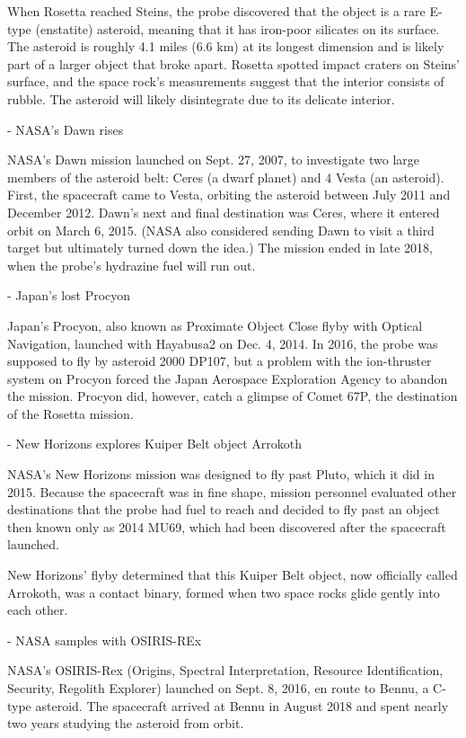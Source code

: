 When Rosetta reached Steins, the probe discovered that the object is a rare
E-type (enstatite) asteroid, meaning that it has iron-poor silicates on its
surface. The asteroid is roughly 4.1 miles (6.6 km) at its longest dimension and
is likely part of a larger object that broke apart. Rosetta spotted impact
craters on Steins' surface, and the space rock's measurements suggest that the
interior consists of rubble. The asteroid will likely disintegrate due to its
delicate interior.

- NASA's Dawn rises

NASA's Dawn mission launched on Sept. 27, 2007, to investigate two large members
of the asteroid belt: Ceres (a dwarf planet) and 4 Vesta (an asteroid). First,
the spacecraft came to Vesta, orbiting the asteroid between July 2011 and
December 2012. Dawn's next and final destination was Ceres, where it entered
orbit on March 6, 2015. (NASA also considered sending Dawn to visit a third
target but ultimately turned down the idea.) The mission ended in late 2018,
when the probe's hydrazine fuel will run out.

- Japan's lost Procyon

Japan's Procyon, also known as Proximate Object Close flyby with Optical
Navigation, launched with Hayabusa2 on Dec. 4, 2014. In 2016, the probe was
supposed to fly by asteroid 2000 DP107, but a problem with the ion-thruster
system on Procyon forced the Japan Aerospace Exploration Agency to abandon the
mission. Procyon did, however, catch a glimpse of Comet 67P, the destination of
the Rosetta mission.

- New Horizons explores Kuiper Belt object Arrokoth

NASA's New Horizons mission was designed to fly past Pluto, which it did in
2015. Because the spacecraft was in fine shape, mission personnel evaluated
other destinations that the probe had fuel to reach and decided to fly past an
object then known only as 2014 MU69, which had been discovered after the
spacecraft launched.

New Horizons' flyby determined that this Kuiper Belt object, now officially
called Arrokoth, was a contact binary, formed when two space rocks glide gently
into each other.


- NASA samples with OSIRIS-REx

NASA's OSIRIS-Rex (Origins, Spectral Interpretation, Resource Identification,
Security, Regolith Explorer) launched on Sept. 8, 2016, en route to Bennu, a
C-type asteroid. The spacecraft arrived at Bennu in August 2018 and spent nearly
two years studying the asteroid from orbit.

